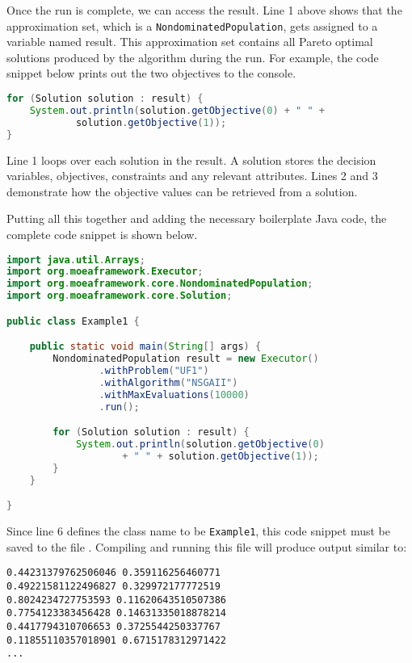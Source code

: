 Once the run is complete, we can access the result.  Line 1 above shows that the approximation set, which is a \texttt{NondominatedPopulation}, gets assigned to a variable named result.  This approximation set contains all Pareto optimal solutions produced by the algorithm during the run.  For example, the code snippet below prints out the two objectives to the console.

\begin{lstlisting}[language=Java]
for (Solution solution : result) {
	System.out.println(solution.getObjective(0) + " " +
			solution.getObjective(1));
}
\end{lstlisting}

Line 1 loops over each solution in the result.  A solution stores the decision variables, objectives, constraints and any relevant attributes.  Lines 2 and 3 demonstrate how the objective values can be retrieved from a solution.

Putting all this together and adding the necessary boilerplate Java code, the complete code snippet is shown below.

\begin{lstlisting}[language=Java]
import java.util.Arrays;
import org.moeaframework.Executor;
import org.moeaframework.core.NondominatedPopulation;
import org.moeaframework.core.Solution;

public class Example1 {

	public static void main(String[] args) {
		NondominatedPopulation result = new Executor()
				.withProblem("UF1")
				.withAlgorithm("NSGAII")
				.withMaxEvaluations(10000)
				.run();

		for (Solution solution : result) {
			System.out.println(solution.getObjective(0) 
					+ " " + solution.getObjective(1));
		}
	}

}
\end{lstlisting}

Since line 6 defines the class name to be \texttt{Example1}, this code snippet must be saved to the file .  Compiling and running this file will produce output similar to:

\begin{lstlisting}[language=Plaintext]
0.44231379762506046 0.359116256460771
0.49221581122496827 0.329972177772519
0.8024234727753593 0.11620643510507386
0.7754123383456428 0.14631335018878214
0.4417794310706653 0.3725544250337767
0.11855110357018901 0.6715178312971422
...
\end{lstlisting}

